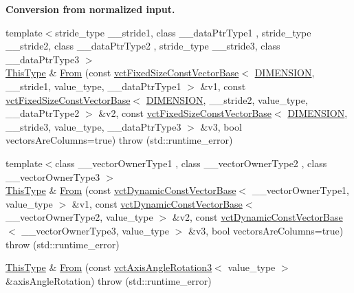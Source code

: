\begin{Indent}{\bf Conversion from normalized input.}
\begin{DoxyCompactItemize}
{\footnotesize template$<$stride\+\_\+type \+\_\+\+\_\+stride1, class \+\_\+\+\_\+data\+Ptr\+Type1 , stride\+\_\+type \+\_\+\+\_\+stride2, class \+\_\+\+\_\+data\+Ptr\+Type2 , stride\+\_\+type \+\_\+\+\_\+stride3, class \+\_\+\+\_\+data\+Ptr\+Type3 $>$ }\\\hyperlink{classvct_matrix_rotation3_base_a027be766cb10ca3c2ad8e85c28ed0af9}{This\+Type} \& \hyperlink{classvct_matrix_rotation3_base_a4bd40779958850bf66165bbe2308d9da}{From} (const \hyperlink{classvct_fixed_size_const_vector_base}{vct\+Fixed\+Size\+Const\+Vector\+Base}$<$ \hyperlink{classvct_matrix_rotation3_base_a97514c086bdd3a691714817775b02f21a43f9b5ba9769ee62eadd8398853504cd}{D\+I\+M\+E\+N\+S\+I\+O\+N}, \+\_\+\+\_\+stride1, value\+\_\+type, \+\_\+\+\_\+data\+Ptr\+Type1 $>$ \&v1, const \hyperlink{classvct_fixed_size_const_vector_base}{vct\+Fixed\+Size\+Const\+Vector\+Base}$<$ \hyperlink{classvct_matrix_rotation3_base_a97514c086bdd3a691714817775b02f21a43f9b5ba9769ee62eadd8398853504cd}{D\+I\+M\+E\+N\+S\+I\+O\+N}, \+\_\+\+\_\+stride2, value\+\_\+type, \+\_\+\+\_\+data\+Ptr\+Type2 $>$ \&v2, const \hyperlink{classvct_fixed_size_const_vector_base}{vct\+Fixed\+Size\+Const\+Vector\+Base}$<$ \hyperlink{classvct_matrix_rotation3_base_a97514c086bdd3a691714817775b02f21a43f9b5ba9769ee62eadd8398853504cd}{D\+I\+M\+E\+N\+S\+I\+O\+N}, \+\_\+\+\_\+stride3, value\+\_\+type, \+\_\+\+\_\+data\+Ptr\+Type3 $>$ \&v3, bool vectors\+Are\+Columns=true)  throw (std\+::runtime\+\_\+error)
\item 
{\footnotesize template$<$class \+\_\+\+\_\+vector\+Owner\+Type1 , class \+\_\+\+\_\+vector\+Owner\+Type2 , class \+\_\+\+\_\+vector\+Owner\+Type3 $>$ }\\\hyperlink{classvct_matrix_rotation3_base_a027be766cb10ca3c2ad8e85c28ed0af9}{This\+Type} \& \hyperlink{classvct_matrix_rotation3_base_ac405493f34ee307de320ac3f1f394ae0}{From} (const \hyperlink{classvct_dynamic_const_vector_base}{vct\+Dynamic\+Const\+Vector\+Base}$<$ \+\_\+\+\_\+vector\+Owner\+Type1, value\+\_\+type $>$ \&v1, const \hyperlink{classvct_dynamic_const_vector_base}{vct\+Dynamic\+Const\+Vector\+Base}$<$ \+\_\+\+\_\+vector\+Owner\+Type2, value\+\_\+type $>$ \&v2, const \hyperlink{classvct_dynamic_const_vector_base}{vct\+Dynamic\+Const\+Vector\+Base}$<$ \+\_\+\+\_\+vector\+Owner\+Type3, value\+\_\+type $>$ \&v3, bool vectors\+Are\+Columns=true)  throw (std\+::runtime\+\_\+error)
\item 
\hyperlink{classvct_matrix_rotation3_base_a027be766cb10ca3c2ad8e85c28ed0af9}{This\+Type} \& \hyperlink{classvct_matrix_rotation3_base_ae6f3244fc3d07c3bc44db4e1da02f201}{From} (const \hyperlink{classvct_axis_angle_rotation3}{vct\+Axis\+Angle\+Rotation3}$<$ value\+\_\+type $>$ \&axis\+Angle\+Rotation)  throw (std\+::runtime\+\_\+error)

\end{DoxyCompactItemize}
\end{Indent}
